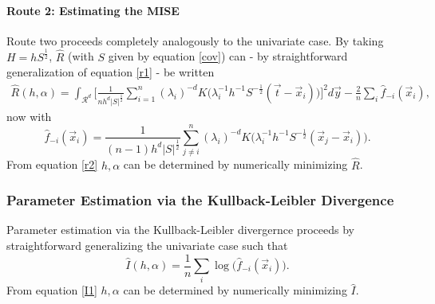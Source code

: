 \documentclass[
twoside,
openright,
titlepage,
numbers=noenddot,
headinclude,%
footinclude=true,
dottedtoc, %
ngerman,
american, %
pagesize=pdftex,
]{book}
\begin{document}
	\paragraph{Route 2: Estimating the MISE}
	Route two proceeds completely analogously to the univariate case. By taking $H=hS^{\frac{1}{2}}$, $\hat{R}$ (with $S$ given by equation \eqref{cov}) can - by straightforward generalization of equation \eqref{r1} - be written
	\begin{equation}
		\begin{split}
			\hat{R}(h,\alpha)=\int_{\mathcal{R}^d} \bigg[\frac{1}{nh^d|S|^{\frac{1}{2}}}\sum_{i=1}^n(\lambda_i)^{-d}K\big(\lambda_i^{-1}h^{-1}S^{-\frac{1}{2}}(\vec{t}-\vec{x}_i)\big)\bigg]^2d\vec{y}-\frac{2}{n}\sum_{i}\hat{f}_{-i}(\vec{x}_i),
		\end{split}
		\label{r2}
	\end{equation}
	now with
	\begin{equation}
		\hat{f}_{-i}(\vec{x}_i)=\frac{1}{(n-1)h^d|S|^{\frac{1}{2}}}\sum_{j\neq i}^n(\lambda_i)^{-d}K\big(\lambda_i^{-1}h^{-1}S^{-\frac{1}{2}}(\vec{x}_j-\vec{x}_i)\big).
	\end{equation} 
	From equation \eqref{r2} $h,\alpha$ can be determined by numerically minimizing $\hat{R}$. 
	
	\subsubsection{Parameter Estimation via the Kullback-Leibler Divergence}
	Parameter estimation via the Kullback-Leibler divergernce proceeds by straightforward generalizing the univariate case such that
	\begin{equation}
		\hat{I}(h,\alpha)=\frac{1}{n}\sum_{i}\log\big(\hat{f}_{-i}(\vec{x}_i)\big).
		\label{I1}
	\end{equation}
	From equation \eqref{I1} $h,\alpha$ can be determined by numerically minimizing $\hat{I}$.
	
\end{document}
